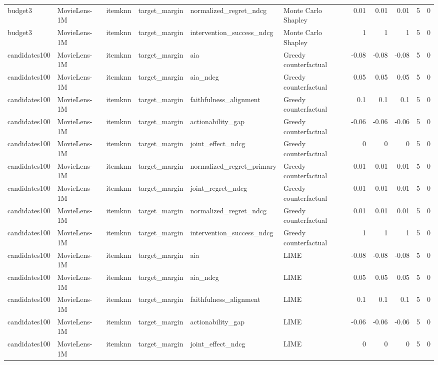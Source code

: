 \begin{table}[t]
{\begin{tabular}{llllllrrrrr}
budget3 & MovieLens-1M & itemknn & target\_margin & normalized\_regret\_ndcg & Monte Carlo Shapley & 0.01 & 0.01 & 0.01 & 5 & 0 \\
budget3 & MovieLens-1M & itemknn & target\_margin & intervention\_success\_ndcg & Monte Carlo Shapley & 1 & 1 & 1 & 5 & 0 \\
candidates100 & MovieLens-1M & itemknn & target\_margin & aia & Greedy counterfactual & -0.08 & -0.08 & -0.08 & 5 & 0 \\
candidates100 & MovieLens-1M & itemknn & target\_margin & aia\_ndcg & Greedy counterfactual & 0.05 & 0.05 & 0.05 & 5 & 0 \\
candidates100 & MovieLens-1M & itemknn & target\_margin & faithfulness\_alignment & Greedy counterfactual & 0.1 & 0.1 & 0.1 & 5 & 0 \\
candidates100 & MovieLens-1M & itemknn & target\_margin & actionability\_gap & Greedy counterfactual & -0.06 & -0.06 & -0.06 & 5 & 0 \\
candidates100 & MovieLens-1M & itemknn & target\_margin & joint\_effect\_ndcg & Greedy counterfactual & 0 & 0 & 0 & 5 & 0 \\
candidates100 & MovieLens-1M & itemknn & target\_margin & normalized\_regret\_primary & Greedy counterfactual & 0.01 & 0.01 & 0.01 & 5 & 0 \\
candidates100 & MovieLens-1M & itemknn & target\_margin & joint\_regret\_ndcg & Greedy counterfactual & 0.01 & 0.01 & 0.01 & 5 & 0 \\
candidates100 & MovieLens-1M & itemknn & target\_margin & normalized\_regret\_ndcg & Greedy counterfactual & 0.01 & 0.01 & 0.01 & 5 & 0 \\
candidates100 & MovieLens-1M & itemknn & target\_margin & intervention\_success\_ndcg & Greedy counterfactual & 1 & 1 & 1 & 5 & 0 \\
candidates100 & MovieLens-1M & itemknn & target\_margin & aia & LIME & -0.08 & -0.08 & -0.08 & 5 & 0 \\
candidates100 & MovieLens-1M & itemknn & target\_margin & aia\_ndcg & LIME & 0.05 & 0.05 & 0.05 & 5 & 0 \\
candidates100 & MovieLens-1M & itemknn & target\_margin & faithfulness\_alignment & LIME & 0.1 & 0.1 & 0.1 & 5 & 0 \\
candidates100 & MovieLens-1M & itemknn & target\_margin & actionability\_gap & LIME & -0.06 & -0.06 & -0.06 & 5 & 0 \\
candidates100 & MovieLens-1M & itemknn & target\_margin & joint\_effect\_ndcg & LIME & 0 & 0 & 0 & 5 & 0 \\

\end{tabular}}
\end{table}
